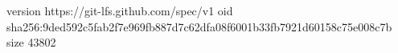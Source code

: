 version https://git-lfs.github.com/spec/v1
oid sha256:9ded592c5fab2f7e969fb887d7c62dfa08f6001b33fb7921d60158c75e008c7b
size 43802
